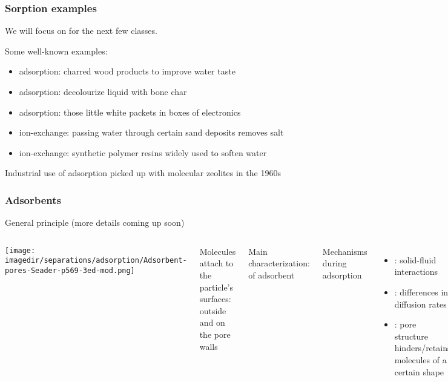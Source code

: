 \begin{frame}\frametitle{Sorption examples}
	\begin{exampleblock}{}
		We will focus on {\color{myGreen}{(ad)sorption}} for the next few classes.
	\end{exampleblock}
	
	\vspace{12pt}
	Some well-known examples:
	\begin{itemize}
		\item	adsorption: charred wood products to improve water taste
		\item	adsorption: decolourize liquid with bone char
		\item	adsorption: those little white packets in boxes of electronics
		\item	ion-exchange: passing water through certain sand deposits removes salt
		\item	ion-exchange: synthetic polymer resins widely used to soften water
	\end{itemize}
	
	Industrial use of adsorption picked up with molecular zeolites in the 1960s
\end{frame}

\begin{frame}\frametitle{Adsorbents}
	General principle (more details coming up soon)
	\begin{columns}[c]
			\begin{center}
				\texttt{[image: \\imagedir/separations/adsorption/Adsorbent-pores-Seader-p569-3ed-mod.png]}
			\end{center}
			Molecules attach to the particle's surfaces: outside and on the pore walls
			
			\vspace{12pt}
			Main characterization: {\color{purple}{pore diameter}} of adsorbent
			
			\vspace{12pt}
			Mechanisms during adsorption
				\begin{itemize}
				\item	{\color{purple}{equilibrium interaction}}: solid-fluid interactions
				\item	{\color{purple}{kinetic}}: differences in diffusion rates
				\item	{\color{purple}{steric}}: pore structure hinders/retains molecules of a certain shape
			\end{itemize}
	\end{columns}
\end{frame}

